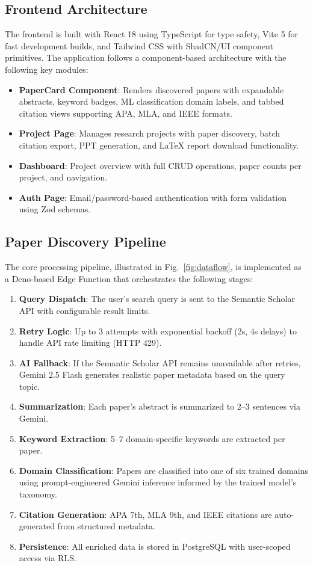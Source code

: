 \documentclass[conference]{IEEEtran}
\begin{document}
\subsection{Frontend Architecture}

The frontend is built with React 18 using TypeScript for type safety, Vite 5 for fast development builds, and Tailwind CSS with ShadCN/UI component primitives. The application follows a component-based architecture with the following key modules:

\begin{itemize}
    \item \textbf{PaperCard Component}: Renders discovered papers with expandable abstracts, keyword badges, ML classification domain labels, and tabbed citation views supporting APA, MLA, and IEEE formats.
    \item \textbf{Project Page}: Manages research projects with paper discovery, batch citation export, PPT generation, and LaTeX report download functionality.
    \item \textbf{Dashboard}: Project overview with full CRUD operations, paper counts per project, and navigation.
    \item \textbf{Auth Page}: Email/password-based authentication with form validation using Zod schemas.
\end{itemize}

\subsection{Paper Discovery Pipeline}

The core processing pipeline, illustrated in Fig.~\ref{fig:dataflow}, is implemented as a Deno-based Edge Function that orchestrates the following stages:

\begin{enumerate}
    \item \textbf{Query Dispatch}: The user's search query is sent to the Semantic Scholar API with configurable result limits.
    \item \textbf{Retry Logic}: Up to 3 attempts with exponential backoff (2s, 4s delays) to handle API rate limiting (HTTP 429).
    \item \textbf{AI Fallback}: If the Semantic Scholar API remains unavailable after retries, Gemini 2.5 Flash generates realistic paper metadata based on the query topic.
    \item \textbf{Summarization}: Each paper's abstract is summarized to 2--3 sentences via Gemini.
    \item \textbf{Keyword Extraction}: 5--7 domain-specific keywords are extracted per paper.
    \item \textbf{Domain Classification}: Papers are classified into one of six trained domains using prompt-engineered Gemini inference informed by the trained model's taxonomy.
    \item \textbf{Citation Generation}: APA 7th, MLA 9th, and IEEE citations are auto-generated from structured metadata.
    \item \textbf{Persistence}: All enriched data is stored in PostgreSQL with user-scoped access via RLS.
\end{enumerate}
\end{document}
